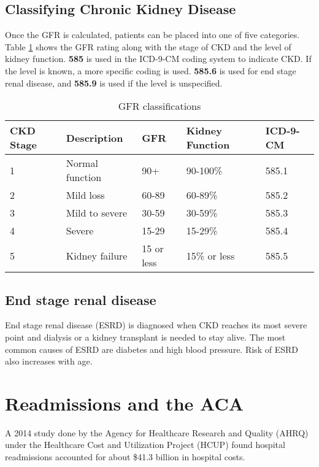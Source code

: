 \subsection{Classifying Chronic Kidney Disease}

Once the GFR is calculated, patients can be placed into one of five categories. Table \ref{tab:gfr} shows the 
GFR rating along with the stage of CKD and the level of kidney function. \textbf{585} is used in the ICD-9-CM coding system
to indicate CKD. If the level is known, a more specific coding is used. \textbf{585.6} is used for end stage renal disease,
and \textbf{585.9} is used if the level is unspecified.

\begin{table}[]
\centering
\label{my-label}
\begin{tabular}{lllll}
CKD Stage & Description             & GFR        & Kidney Function & ICD-9-CM \\
\hline
1         & Normal function         & 90+        & 90-100\%        & 585.1    \\
2         & Mild loss               & 60-89      & 60-89\%         & 585.2    \\
3         & Mild to severe          & 30-59      & 30-59\%         & 585.3    \\
4         & Severe                  & 15-29      & 15-29\%         & 585.4    \\
5         & Kidney failure          & 15 or less & 15\% or less    & 585.5    \\
\end{tabular}\caption{GFR classifications}\label{tab:gfr}
\end{table}

\subsection{End stage renal disease}

End stage renal disease (ESRD) is diagnosed when CKD reaches its most severe point and dialysis or a kidney transplant is needed to stay alive.
The most common causes of ESRD are diabetes and high blood pressure. Risk of ESRD also increases with age.


\section{Readmissions and the ACA}

A 2014 study done by the Agency for Healthcare Research and Quality (AHRQ) under the Healthcare Cost and Utilization
Project (HCUP) found hospital readmissions accounted for about \$41.3 billion in hospital costs.  \cite{Hines2014}

